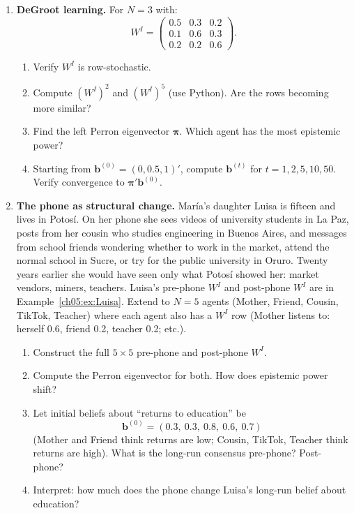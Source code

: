 \documentclass[../structural_economics_book.tex]{subfiles}
\begin{document}
\begin{enumerate}[label=\textbf{5.\arabic*}, leftmargin=3em]
\item \textbf{DeGroot learning.} For $N = 3$ with:
\begin{equation}
W^I = \begin{pmatrix} 0.5 & 0.3 & 0.2 \\ 0.1 & 0.6 & 0.3 \\ 0.2 & 0.2 & 0.6 \end{pmatrix}.
\end{equation}
\begin{enumerate}
\item Verify $W^I$ is row-stochastic.
\item Compute $(W^I)^2$ and $(W^I)^5$ (use Python). Are the rows becoming more similar?
\item Find the left Perron eigenvector $\boldsymbol{\pi}$. Which agent has the most epistemic power?
\item Starting from $\mathbf{b}^{(0)} = (0, 0.5, 1)'$, compute $\mathbf{b}^{(t)}$ for $t = 1, 2, 5, 10, 50$. Verify convergence to $\boldsymbol{\pi}'\mathbf{b}^{(0)}$.
\end{enumerate}

\item \textbf{The phone as structural change.} Mar\'{i}a's daughter Luisa is fifteen and lives in Potos\'{i}. On her phone she sees videos of university students in La Paz, posts from her cousin who studies engineering in Buenos Aires, and messages from school friends wondering whether to work in the market, attend the normal school in Sucre, or try for the public university in Oruro. Twenty years earlier she would have seen only what Potos\'{i} showed her: market vendors, miners, teachers. Luisa's pre-phone $W^I$ and post-phone $W^I$ are in Example~\ref{ch05:ex:Luisa}. Extend to $N = 5$ agents (Mother, Friend, Cousin, TikTok, Teacher) where each agent also has a $W^I$ row (Mother listens to: herself 0.6, friend 0.2, teacher 0.2; etc.).
\begin{enumerate}
\item Construct the full $5 \times 5$ pre-phone and post-phone $W^I$.
\item Compute the Perron eigenvector for both. How does epistemic power shift?
\item Let initial beliefs about ``returns to education'' be
\begin{equation*}
\mathbf{b}^{(0)} = (0.3,\ 0.3,\ 0.8,\ 0.6,\ 0.7)
\end{equation*}
(Mother and Friend think returns are low; Cousin, TikTok, Teacher think returns are high). What is the long-run consensus pre-phone? Post-phone?
\item Interpret: how much does the phone change Luisa's long-run belief about education?
\end{enumerate}


\end{enumerate}
\end{document}
